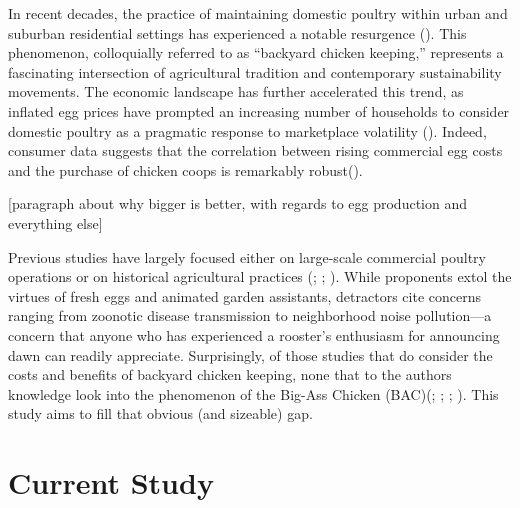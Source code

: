 \documentclass[
  man,
  floatsintext,
  longtable,
  nolmodern,
  notxfonts,
  notimes,
  colorlinks=true,linkcolor=blue,citecolor=blue,urlcolor=blue]{apa7}
\begin{document}
In recent decades, the practice of maintaining domestic poultry within
urban and suburban residential settings has experienced a notable
resurgence (). This phenomenon, colloquially referred to as ``backyard chicken
keeping,'' represents a fascinating intersection of agricultural
tradition and contemporary sustainability movements. The economic
landscape has further accelerated this trend, as inflated egg prices
have prompted an increasing number of households to consider domestic
poultry as a pragmatic response to marketplace volatility
(). Indeed,
consumer data suggests that the correlation between rising commercial
egg costs and the purchase of chicken coops is remarkably
robust().

{[}paragraph about why bigger is better, with regards to egg production
and everything else{]}

Previous studies have largely focused either on large-scale commercial
poultry operations or on historical agricultural practices
(;
;
).
While proponents extol the virtues of fresh eggs and animated garden
assistants, detractors cite concerns ranging from zoonotic disease
transmission to neighborhood noise pollution---a concern that anyone who
has experienced a rooster's enthusiasm for announcing dawn can readily
appreciate. Surprisingly, of those studies that do consider the costs
and benefits of backyard chicken keeping, none that to the authors
knowledge look into the phenomenon of the Big-Ass Chicken
(BAC)(; ;
;
).
This study aims to fill that obvious (and sizeable) gap.

\section{Current Study}\label{current-study}
\end{document}
